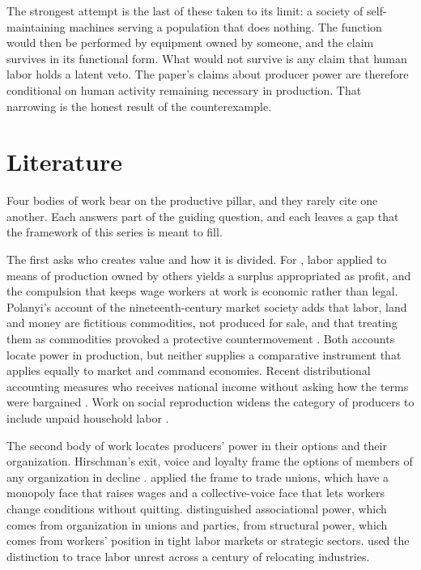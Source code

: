 \documentclass[11pt,letterpaper]{article}
\theoremstyle{definition}
\theoremstyle{remark}
\begin{document}
The strongest attempt is the last of these taken to its limit: a society of self-maintaining machines serving a population that does nothing. The function would then be performed by equipment owned by someone, and the claim survives in its functional form. What would not survive is any claim that human labor holds a latent veto. The paper's claims about producer power are therefore conditional on human activity remaining necessary in production. That narrowing is the honest result of the counterexample.

\section{Literature}
\label{sec:literature}

Four bodies of work bear on the productive pillar, and they rarely cite one another. Each answers part of the guiding question, and each leaves a gap that the framework of this series is meant to fill.

The first asks who creates value and how it is divided. For \citet{marx1976}, labor applied to means of production owned by others yields a surplus appropriated as profit, and the compulsion that keeps wage workers at work is economic rather than legal. Polanyi's account of the nineteenth-century market society adds that labor, land and money are fictitious commodities, not produced for sale, and that treating them as commodities provoked a protective countermovement \citep{polanyi1944}. Both accounts locate power in production, but neither supplies a comparative instrument that applies equally to market and command economies. Recent distributional accounting measures who receives national income without asking how the terms were bargained \citep{piketty2018}. Work on social reproduction widens the category of producers to include unpaid household labor \citep{laslett1989}.

The second body of work locates producers' power in their options and their organization. Hirschman's exit, voice and loyalty frame the options of members of any organization in decline \citep{hirschman1970}. \citet{freeman1984} applied the frame to trade unions, which have a monopoly face that raises wages and a collective-voice face that lets workers change conditions without quitting. \citet{wright2000} distinguished associational power, which comes from organization in unions and parties, from structural power, which comes from workers' position in tight labor markets or strategic sectors. \citet{silver2003} used the distinction to trace labor unrest across a century of relocating industries.
\end{document}
